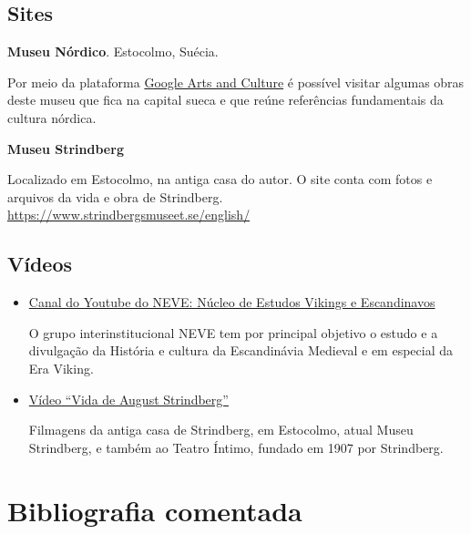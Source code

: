 \documentclass[12pt]{extarticle}
\begin{document}
\subsection{Sites}

\textbf{Museu Nórdico}. Estocolmo, Suécia.

Por meio da plataforma \href{https://artsandculture.google.com/partner/nordiska-museet}{Google Arts and Culture} é possível visitar algumas obras deste 
museu que fica na capital sueca e que reúne referências fundamentais da cultura nórdica.

\textbf{Museu Strindberg} 

Localizado em Estocolmo, na antiga casa do autor. O site conta com fotos e arquivos da vida e obra de Strindberg.
\url{https://www.strindbergsmuseet.se/english/}

\subsection{Vídeos}

\begin{itemize}
\item \href{https://www.youtube.com/channel/UCyi7TQJOK1kyIU6e4pRJrUQ}{Canal do Youtube do NEVE: Núcleo de Estudos Vikings e Escandinavos}

O grupo interinstitucional NEVE tem por principal objetivo o estudo e a divulgação da História e cultura da Escandinávia Medieval e em especial da Era Viking.

\item \href{https://www.youtube.com/watch?v=dxv7rPx8A5Q}{Vídeo ``Vida de August Strindberg''}

Filmagens da antiga casa de Strindberg, em Estocolmo, atual Museu Strindberg, e também ao Teatro Íntimo, fundado em 1907 por Strindberg.

\end{itemize}


\section{Bibliografia comentada}
\end{document}
